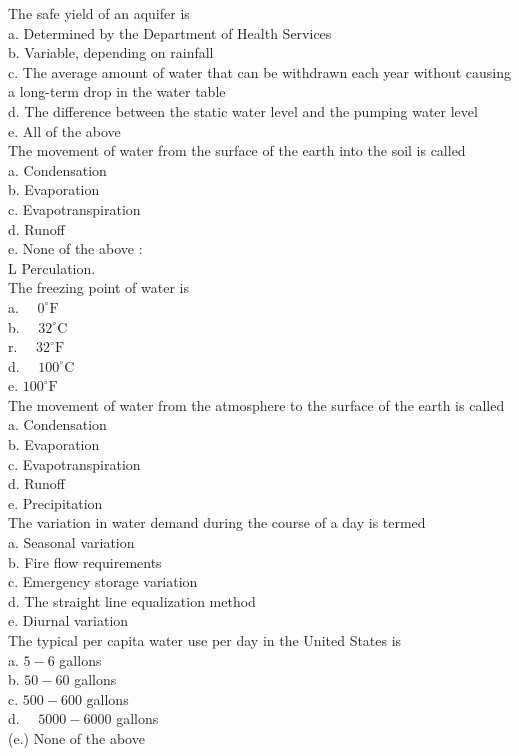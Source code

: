 The safe yield of an aquifer is\\
a. Determined by the Department of Health Services\\
b. Variable, depending on rainfall\\
c. The average amount of water that can be withdrawn each year without causing a long-term drop in the water table\\
d. The difference between the static water level and the pumping water level\\
e. All of the above\\

The movement of water from the surface of the earth into the soil is called\\
a. Condensation\\
b. Evaporation\\
c. Evapotranspiration\\
d. Runoff\\
e. None of the above :\\
L Perculation.\\

The freezing point of water is\\
a. $\quad 0^{\circ} \mathrm{F}$\\
b. $\quad 32^{\circ} \mathrm{C}$\\
r. $\quad 32^{\circ} \mathrm{F}$\\
d. $\quad 100^{\circ} \mathrm{C}$\\
e. $100^{\circ} \mathrm{F}$\\

The movement of water from the atmosphere to the surface of the earth is called\\
a. Condensation\\
b. Evaporation\\
c. Evapotranspiration\\
d. Runoff\\
e. Precipitation\\

The variation in water demand during the course of a day is termed\\
a. Seasonal variation\\
b. Fire flow requirements\\
c. Emergency storage variation\\
d. The straight line equalization method\\
e. Diurnal variation\\

The typical per capita water use per day in the United States is\\
a. $5-6$ gallons\\
b. $50-60$ gallons\\
c. $500-600$ gallons\\
d. $\quad 5000-6000$ gallons\\
(e.) None of the above\\


